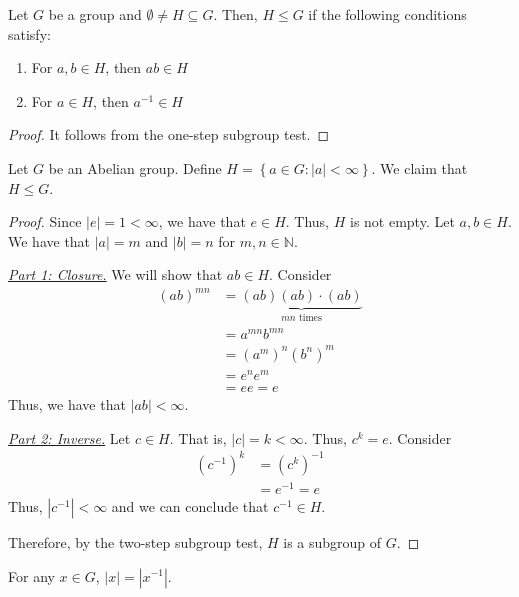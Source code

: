 \begin{theorem}
    Let \(G\) be a group and \(\emptyset \neq H \subseteq G\). Then, \(H \leq G\) if the following conditions satisfy:
    \begin{enumerate}
        \item For \(a, b \in H\), then \(ab \in H\)
        \item For \(a \in H\), then \(a^{-1} \in H\)
    \end{enumerate}
\end{theorem}

\begin{proof}
    It follows from the one-step subgroup test.
\end{proof}

\begin{nexample}
    Let \(G\) be an Abelian group. Define \(H = \left\{a \in G : |a| < \infty\right\}\). We claim that \(H \leq G\).

    \begin{proof}
        Since \(|e| = 1 < \infty\), we have that \(e \in H\). Thus, \(H\) is not empty. Let \(a, b \in H\). We have that \(|a| = m\) and \(|b| = n\) for \(m, n \in \mathbb{N}\).

        \underline{\textit{Part 1: Closure.}} We will show that \(ab \in H\). Consider
        \[
        \begin{aligned}
            (ab)^{mn} &= \underbrace{(ab)(ab)\cdot(ab)}_\text{\(mn\) times} \\
                      &= a^{mn}b^{mn} \\
                      &= (a^m)^n(b^n)^m \\
                      &= e^ne^m \\
                      &= ee = e
        \end{aligned}
        \]
        Thus, we have that \(|ab| < \infty\).

        \underline{\textit{Part 2: Inverse.}} Let \(c \in H\). That is, \(|c| = k < \infty\). Thus, \(c^k = e\). Consider
        \[
        \begin{aligned}
            (c^{-1})^k &= (c^k)^{-1} \\
                       &= e^{-1} = e
        \end{aligned}
        \]
        Thus, \(|c^{-1}| < \infty\) and we can conclude that \(c^{-1} \in H\).

        Therefore, by the two-step subgroup test, \(H\) is a subgroup of \(G\).
    \end{proof}

    \begin{remark}
        For any \(x \in G\), \(|x| = |x^{-1}|\).
    \end{remark}
\end{nexample}

